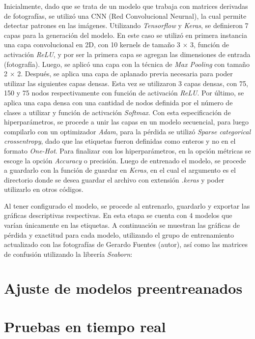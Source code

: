 Inicialmente, dado que se trata de un modelo que trabaja con matrices derivadas de fotografías, se utilizó una CNN (Red Convolucional Neurnal), la cual permite detectar patrones en las imágenes. Utilizando \textit{Tensorflow} y \textit{Keras}, se definieron 7 capas para la generación del modelo. En este caso se utilizó en primera instancia una capa convolucional en 2D, con 10 kernels de tamaño 3 $\times$ 3, función de activación \textit{ReLU}, y por ser la primera capa se agregan las dimensiones de entrada (fotografía). Luego, se aplicó una capa con la técnica de \textit{Max Pooling} con tamaño 2 $\times$ 2. Después, se aplica una capa de aplanado previa necesaria para poder utilizar las siguientes capas densas. Esta vez se utilizaron 3 capas densas, con 75, 150 y 75 nodos respectivamente con función de activación \textit{ReLU}. Por último, se aplica una capa densa con una cantidad de nodos definida por el número de clases a utilizar y función de activación \textit{Softmax}. Con esta especificación de hiperparámetros, se procede a unir las capas en un modelo secuencial, para luego compilarlo con un optimizador \textit{Adam}, para la pérdida se utilizó \textit{Sparse categorical crossentropy}, dado que las etiquetas fueron definidas como enteros y no en el formato \textit{One-Hot}. Para finalizar con los hiperparámetros, en la opción métricas se escoge la opción \textit{Accuracy} o precisión. Luego de entrenado el modelo, se procede a guardarlo con la función de guardar en \textit{Keras}, en el cual el argumento es el directorio donde se desea guardar el archivo con extensión \textit{.keras} y poder utilizarlo en otros códigos.

Al tener configurado el modelo, se procede al entrenarlo, guardarlo y exportar las gráficas descriptivas respectivas. En esta etapa se cuenta con 4 modelos que varían únicamente en las etiquetas. A continuación se muestran las gráficas de pérdida y exactitud para cada modelo, utilizando el grupo de entrenamiento actualizado con las fotografías de Gerardo Fuentes (autor), así como las matrices de confusión utilizando la librería \textit{Seaborn}:


\section{Ajuste de modelos preentreanados}
\section{Pruebas en tiempo real}




